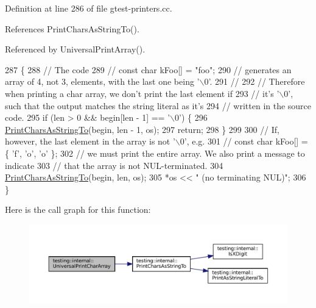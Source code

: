 Definition at line 286 of file gtest-\/printers.\+cc.



References Print\+Chars\+As\+String\+To().



Referenced by Universal\+Print\+Array().


\begin{DoxyCode}
287                                                     \{
288   \textcolor{comment}{// The code}
289   \textcolor{comment}{//   const char kFoo[] = "foo";}
290   \textcolor{comment}{// generates an array of 4, not 3, elements, with the last one being '\(\backslash\)0'.}
291   \textcolor{comment}{//}
292   \textcolor{comment}{// Therefore when printing a char array, we don't print the last element if}
293   \textcolor{comment}{// it's '\(\backslash\)0', such that the output matches the string literal as it's}
294   \textcolor{comment}{// written in the source code.}
295   \textcolor{keywordflow}{if} (len > 0 && begin[len - 1] == \textcolor{charliteral}{'\(\backslash\)0'}) \{
296     \hyperlink{namespacetesting_1_1internal_a0be71e6d7cb274131c559193f81c83e2}{PrintCharsAsStringTo}(begin, len - 1, os);
297     \textcolor{keywordflow}{return};
298   \}
299 
300   \textcolor{comment}{// If, however, the last element in the array is not '\(\backslash\)0', e.g.}
301   \textcolor{comment}{//    const char kFoo[] = \{ 'f', 'o', 'o' \};}
302   \textcolor{comment}{// we must print the entire array.  We also print a message to indicate}
303   \textcolor{comment}{// that the array is not NUL-terminated.}
304   \hyperlink{namespacetesting_1_1internal_a0be71e6d7cb274131c559193f81c83e2}{PrintCharsAsStringTo}(begin, len, os);
305   *os << \textcolor{stringliteral}{" (no terminating NUL)"};
306 \}
\end{DoxyCode}
Here is the call graph for this function\+:
\nopagebreak
\begin{figure}[H]
\begin{center}
\leavevmode
\includegraphics[width=350pt]{namespacetesting_1_1internal_ad896a4e4d9133ce43dc18b6038d95dc3_cgraph}
\end{center}
\end{figure}
